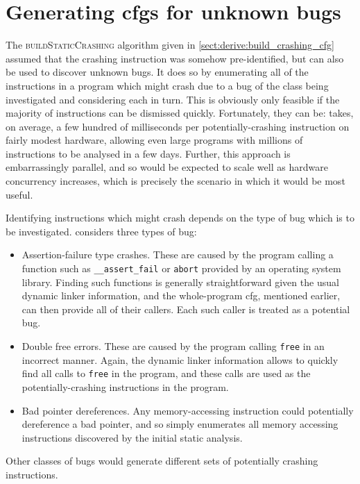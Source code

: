 \section{Generating \protect\glspl{cfg} for unknown bugs}
\label{sect:derive:unknown_bugs}

The \textsc{buildStaticCrashing} algorithm given in
\autoref{sect:derive:build_crashing_cfg} assumed that the crashing
instruction was somehow pre-identified, but {\technique} can also be
used to discover unknown bugs.  It does so by enumerating all of the
instructions in a program which might crash due to a bug of the class
being investigated and considering each in turn.  This is obviously
only feasible if the majority of instructions can be dismissed
quickly.  Fortunately, they can be: {\implementation} takes, on
average, a few hundred of milliseconds per potentially-crashing
instruction on fairly modest hardware, allowing even large programs
with millions of instructions to be analysed in a few days.  Further,
this approach is embarrassingly parallel, and so would be expected to
scale well as hardware concurrency increases, which is precisely the
scenario in which it would be most useful.

Identifying instructions which might crash depends on the type of bug
which is to be investigated.  {\Implementation} considers three types
of bug:
\begin{itemize}
\item Assertion-failure type crashes.  These are caused by the program
  calling a function such as \verb|__assert_fail| or \verb|abort|
  provided by an operating system library.  Finding such functions is
  generally straightforward given the usual dynamic linker
  information, and the whole-program \gls{cfg}, mentioned earlier, can
  then provide all of their callers.  Each such caller is treated as a
  potential bug.
\item Double free errors.  These are caused by the program calling
  \verb|free| in an incorrect manner.  Again, the dynamic linker
  information allows {\implementation} to quickly find all calls to
  \verb|free| in the program, and these calls are used as the
  potentially-crashing instructions in the program.
\item Bad pointer dereferences.  Any memory-accessing instruction
  could potentially dereference a bad pointer, and so
  {\implementation} simply enumerates all memory accessing
  instructions discovered by the initial static analysis.
\end{itemize}
Other classes of bugs would generate different sets of potentially
crashing instructions.

